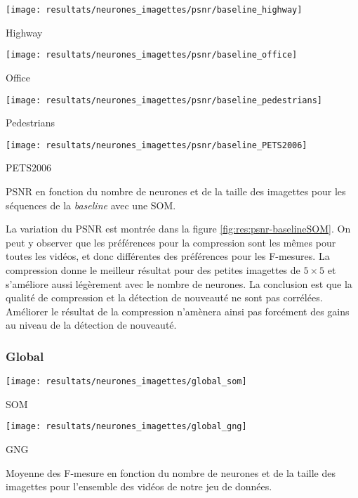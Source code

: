 	\begin{figureth}
		\begin{subfigureth}{.45\textwidth}
			\texttt{[image: resultats/neurones\_imagettes/psnr/baseline\_highway]}\caption{Highway}
		\end{subfigureth}
		\begin{subfigureth}{.45\textwidth}
			\texttt{[image: resultats/neurones\_imagettes/psnr/baseline\_office]}\caption{Office}
		\end{subfigureth}
		\begin{subfigureth}{.45\textwidth}
			\texttt{[image: resultats/neurones\_imagettes/psnr/baseline\_pedestrians]}\caption{Pedestrians}
		\end{subfigureth}
		\begin{subfigureth}{.45\textwidth}
			\texttt{[image: resultats/neurones\_imagettes/psnr/baseline\_PETS2006]}\caption{PETS2006}
		\end{subfigureth}
		\caption[Nombre de neurones et de taille des imagettes, PSNR/SOM/baseline]{PSNR en fonction du nombre de neurones et de la taille des imagettes pour les séquences de la \textit{baseline} avec une SOM.}\label{fig:res:psnr-baselineSOM}
	\end{figureth}

	La variation du PSNR est montrée dans la figure \ref{fig:res:psnr-baselineSOM}. On peut y observer que les préférences pour la compression sont les mêmes pour toutes les vidéos, et donc différentes des préférences pour les F-mesures. La compression donne le meilleur résultat pour des petites imagettes de $5\times5$ et s'améliore aussi légèrement avec le nombre de neurones. La conclusion est que la qualité de compression et la détection de nouveauté ne sont pas corrélées. Améliorer le résultat de la compression n'amènera ainsi pas forcément des gains au niveau de la détection de nouveauté.
	
	\subsubsection{Global}

	\begin{figureth}
		\begin{subfigureth}{.45\textwidth}
			\texttt{[image: resultats/neurones\_imagettes/global\_som]}\caption{SOM}
		\end{subfigureth}
		\begin{subfigureth}{.45\textwidth}
			\texttt{[image: resultats/neurones\_imagettes/global\_gng]}\caption{GNG}
		\end{subfigureth}
		\caption[Nombre de neurones et de taille des imagettes, Global]{Moyenne des F-mesure en fonction du nombre de neurones et de la taille des imagettes pour l'ensemble des vidéos de notre jeu de données.}\label{fig:res:F-mesure3D-global}
	\end{figureth}


